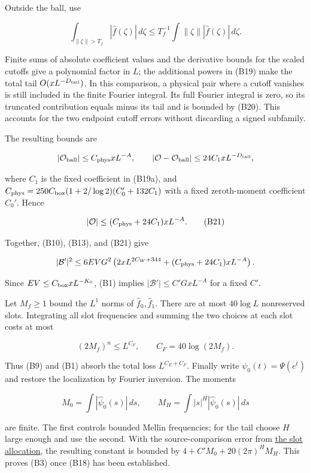 Outside the ball, use

\[
\int_{\|\zeta\|>T_f}|\widehat f(\zeta)|\,d\zeta
\le T_f^{-1}\int\|\zeta\||\widehat f(\zeta)|\,d\zeta. \tag{B20}
\]

Finite sums of absolute coefficient values and the derivative bounds for
the scaled cutoffs give a polynomial factor in \(L\); the additional
powers in (B19) make the total tail \(O(xL^{-D_{\rm tail}})\). In this
comparison, a physical pair where a cutoff vanishes is still included in
the finite Fourier integral. Its full Fourier integral is zero, so its
truncated contribution equals minus its tail and is bounded by (B20).
This accounts for the two endpoint cutoff errors without discarding a
signed subfamily.

The resulting bounds are

\[
|\mathcal O_{\rm ball}|\le C_{\rm phys}xL^{-A},\qquad
|\mathcal O-\mathcal O_{\rm ball}|\le24C_1xL^{-D_{\rm tail}},
\]

where \(C_1\) is the fixed coefficient in (B19a), and
\(C_{\rm phys}=250C_{\rm box}(1+2/\log2)(C_0'+132C_1)\) with a fixed
zeroth-moment coefficient \(C_0'\). Hence

\[
|\mathcal O|\le(C_{\rm phys}+24C_1)xL^{-A}. \tag{B21}
\]

Together, (B10), (B13), and (B21) give

\[
|\mathcal B'|^2\le6EVG^2
 \left(2xL^{2C_W+344}+(C_{\rm phys}+24C_1)xL^{-A}\right).
\]

Since \(EV\le C_{\rm box}xL^{-K_0}\), (B1) implies
\(|\mathcal B'|\le C'GxL^{-A}\) for a fixed \(C'\).

Let \(M_f\ge1\) bound the \(L^1\) norms of
\(\widehat f_0,\widehat f_1\). There are at most \(40\log L\)
nonreserved slots. Integrating all slot frequencies and summing the two
choices at each slot costs at most

\[
(2M_f)^n\le L^{C_F},\qquad C_F=40\log(2M_f). \tag{B22}
\]

Thus (B9) and (B1) absorb the total loss \(L^{C_E+C_F}\). Finally write
\(\psi_0(t)=\Psi(e^t)\) and restore the localization by Fourier
inversion. The moments

\[
M_0=\int|\widehat\psi_0(s)|\,ds,\qquad
M_H=\int|s|^H|\widehat\psi_0(s)|\,ds
\]

are finite. The first controls bounded Mellin frequencies; for the tail
choose \(H\) large enough and use the second. With the source-comparison
error from \protect\hyperlink{bilinear-allocating-ordinary-slots}{the
slot allocation}, the resulting constant is bounded by
\(4+C'M_0+20(2\pi)^HM_H\). This proves (B3) once (B18) has been
established.
